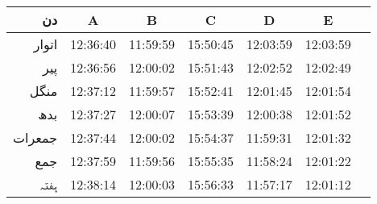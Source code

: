 \begin{center}
\begin{tabular}{rCCCCCC}
\toprule
دن&A&B&C&D&E\\
\midrule
اتوار& 12:36:40 &11:59:59&15:50:45&12:03:59&12:03:59\\
پیر &12:36:56 &12:00:02 &15:51:43&12:02:52&12:02:49\\ 
منگل&12:37:12 &11:59:57 &15:52:41&12:01:45&12:01:54\\
بدھ&12:37:27&12:00:07 &15:53:39&12:00:38&12:01:52\\
جمعرات&12:37:44&12:00:02&15:54:37&11:59:31&12:01:32\\
جمع&12:37:59 &11:59:56 &15:55:35 &11:58:24&12:01:22\\
ہفتہ&12:38:14&12:00:03&15:56:33  &11:57:17 &12:01:12\\
\bottomrule
\end{tabular}
\end{center}

